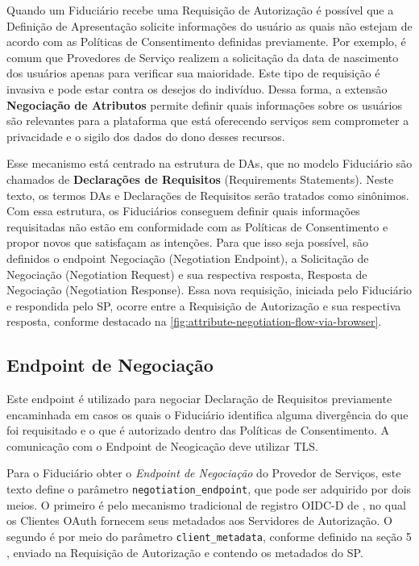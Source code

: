 Quando um Fiduciário recebe uma Requisição de Autorização é possível que a Definição de Apresentação solicite informações do usuário as quais não estejam de acordo com as Políticas de Consentimento definidas previamente. Por exemplo, é comum que Provedores de Serviço realizem a solicitação da data de nascimento dos  usuários apenas para verificar sua maioridade. Este tipo de requisição é invasiva e pode estar contra os desejos do indivíduo. Dessa forma, a extensão \textbf{Negociação de Atributos} permite definir quais informações sobre os usuários são relevantes para a plataforma que está oferecendo serviços sem comprometer a privacidade e o sigilo dos dados do dono desses recursos.

Esse mecanismo está centrado na estrutura de \acs{DA}s, que no modelo Fiduciário são chamados de \textbf{Declarações de Requisitos} (Requirements Statements). Neste texto, os termos \acs{DA}s e Declarações de Requisitos serão tratados como sinônimos. Com essa estrutura, os Fiduciários conseguem definir quais informações requisitadas não estão em conformidade com as Políticas de Consentimento e propor novos que satisfaçam as intenções. Para que isso seja possível, são definidos o endpoint Negociação (Negotiation Endpoint), a Solicitação de Negociação (Negotiation Request) e sua respectiva resposta, Resposta de Negociação (Negotiation Response). 
Essa nova requisição, iniciada pelo Fiduciário e respondida pelo \acs{SP}, ocorre entre a Requisição de Autorização e sua respectiva resposta, conforme destacado na \autoref{fig:attribute-negotiation-flow-via-browser}.



\subsection{Endpoint de Negociação}\label{subsection:endpoint-negociação}

Este endpoint é utilizado para negociar Declaração de Requisitos previamente encaminhada em casos os quais o Fiduciário identifica alguma divergência do que foi requisitado e o que é autorizado dentro das Políticas de Consentimento. A comunicação com o Endpoint de Neogicação deve utilizar TLS.

Para o Fiduciário obter o \emph{Endpoint de Negociação} do Provedor de Serviços, este texto define o parâmetro \texttt{negotiation\_endpoint}, que pode ser adquirido por dois meios. O primeiro é pelo mecanismo tradicional de registro \acs{OIDC-D} de \cite{sakimura2023openidDiscovery}, no qual os Clientes OAuth fornecem seus metadados aos Servidores de Autorização. O segundo é por meio do parâmetro \texttt{client\_metadata}, conforme definido na seção 5 \cite{OIDC4VP2023}, enviado na Requisição de Autorização e contendo os metadados do \acs{SP}.

